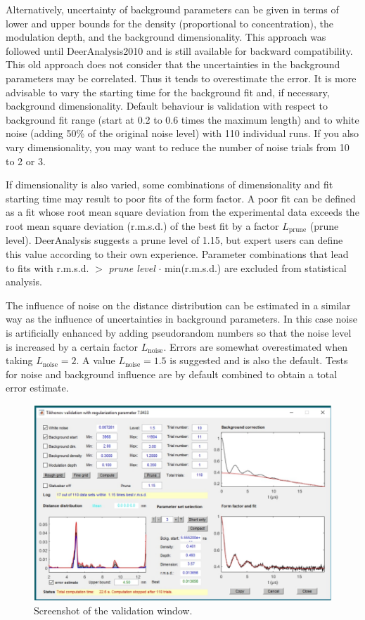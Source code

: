 \documentclass{article}
\begin{document}
Alternatively, uncertainty of background parameters can be given in terms of lower and upper bounds for the density (proportional to concentration), the modulation depth, and the background dimensionality. This approach was followed until DeerAnalysis2010 and is still available for backward compatibility. This old approach does not consider that the uncertainties in the background parameters may be correlated. Thus it tends to overestimate the error. It is more advisable to vary the starting time for the background fit and, if necessary, background dimensionality. Default behaviour is validation with respect to background fit range (start at 0.2 to 0.6 times the maximum length) and to white noise (adding 50\% of the original noise level) with 110 individual runs. If you also vary dimensionality, you may want to reduce the number of noise trials from 10 to 2 or 3.

If dimensionality is also varied, some combinations of dimensionality and fit starting time may result to poor fits of the form factor. A poor fit can be defined as a fit whose root mean square deviation from the experimental data exceeds the root mean square deviation (r.m.s.d.) of the best fit by a factor $L_\mathrm{prune}$ (prune level). DeerAnalysis suggests a prune level of 1.15, but expert users can define this value according to their own experience. Parameter combinations that lead to fits with r.m.s.d. $>$ \emph{prune level} $\cdot$ min(r.m.s.d.) are excluded from statistical analysis. 

The influence of noise on the distance distribution can be estimated in a similar way as the influence of uncertainties in background parameters. In this case noise is artificially enhanced by adding pseudorandom numbers so that the noise level is increased by a certain factor $L_\mathrm{noise}$. Errors are somewhat overestimated when taking $L_\mathrm{noise}=2$. A value $L_\mathrm{noise}=1.5$ is suggested and is also the default. Tests for noise and background influence are by default combined to obtain a total error estimate.

\begin{figure}[ht]
 	\begin{center}
  \includegraphics[width=1.0\textwidth]{fig10.pdf}
	\end{center}
	\caption{Screenshot of the validation window.}
	\label{fig:validation}
\end{figure}
\end{document}
